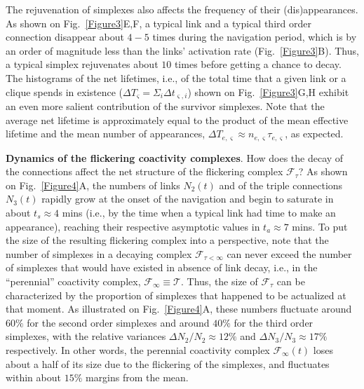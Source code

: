 \documentclass[12pt,tightenlines]{revtex4}
\begin{document}
The rejuvenation of simplexes also affects the frequency of their (dis)appearances. As shown on Fig.~\ref{Figure3}E,F, 
a typical link and a typical third order connection disappear about $4-5$ times during the navigation period, which is by 
an order of magnitude less than the links' activation rate (Fig.~\ref{Figure3}B). Thus, a typical simplex rejuvenates about 
$10$ times before getting a chance to decay. The histograms of the net lifetimes, i.e., of the total time that a given link 
or a clique spends in existence ($\Delta T_{\varsigma} = \Sigma_i \Delta t_{\varsigma,i}$) shown on Fig.~\ref{Figure3}G,H 
exhibit an even more salient contribution of the survivor simplexes. Note that the average net lifetime is approximately 
equal to the product of the mean effective lifetime and the mean number of appearances, $\Delta T_{e,\varsigma}\approx 
n_{e,\varsigma}\tau_{e,\varsigma}$, as expected.

\textbf{Dynamics of the flickering coactivity complexes}. How does the decay of the connections affect the net structure 
of the flickering complex $\mathcal{F}_{\tau}$? As shown on Fig.~\ref{Figure4}A, the numbers of links $N_2(t)$ and of 
the triple connections $N_3(t)$ rapidly grow at the onset of the navigation and begin to saturate in about $t_s \approx 4$ 
mins (i.e., by the time when a typical link had time to make an appearance), reaching their respective asymptotic values 
in $t_a \approx 7$ mins. To put the size of the resulting flickering complex into a perspective, note that the number of 
simplexes in a decaying complex $\mathcal{F}_{\tau<\infty}$ can never exceed the number of simplexes that would have 
existed in absence of link decay, i.e., in the ``perennial'' coactivity complex, $\mathcal{F}_{\infty}\equiv \mathcal{T}$. 
Thus, the size of $\mathcal{F}_{\tau}$ can be characterized by the proportion of simplexes that happened to be actualized 
at that moment. As illustrated on Fig.~\ref{Figure4}A, these numbers fluctuate around $60\%$ for the second order simplexes 
and around $40\%$ for the third order simplexes, with the relative variances $\Delta N_2/N_2 \approx 12\%$ and 
$\Delta N_3/N_3 \approx 17\%$ respectively. In other words, the perennial coactivity complex $\mathcal{F}_{\infty}(t)$ 
loses about a half of its size due to the flickering of the simplexes, and fluctuates within about $15\%$ margins from the mean.
\end{document}
